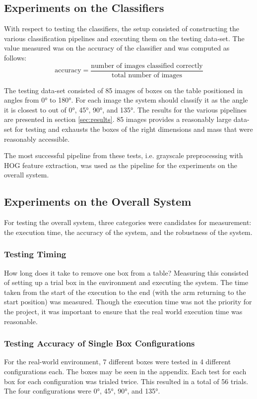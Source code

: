 \documentclass[letterpaper, 10 pt, conference]{conf/ieeeconf}  %
\begin{document}
\subsection{Experiments on the Classifiers}
With respect to testing the classifiers, the setup consisted of constructing the
various classification pipelines and executing them on the testing data-set. The
value measured was on the accuracy of the classifier and was computed as
follows:
\begin{equation*}
  \text{accuracy} = \dfrac{\text{number of images classified correctly}}{\text{total number of images}}
\end{equation*}

The testing data-set consisted of 85 images of boxes on the table positioned in
angles from \ang{0} to \ang{180}. For each image the system should classify it
as the angle it is closest to out of \ang{0}, \ang{45}, \ang{90}, and \ang{135}.
The results for the various pipelines are presented in section
\ref{sec:results}. 85 images provides a reasonably large data-set for testing
and exhausts the boxes of the right dimensions and mass that were reasonably
accessible.

The most successful pipeline from these tests, i.e. grayscale preprocessing with
HOG feature extraction, was used as the pipeline for the experiments on the
overall system.

\subsection{Experiments on the Overall System}
For testing the overall system, three categories were candidates for
measurement: the execution time, the accuracy of the system, and the robustness
of the system.
\subsubsection{Testing Timing}
How long does it take to remove one box from a table? Measuring this consisted
of setting up a trial box in the environment and executing the system. The time
taken from the start of the execution to the end (with the arm returning to the
start position) was measured. Though the execution time was not the priority for
the project, it was important to ensure that the real world execution time was
reasonable.

\subsubsection{Testing Accuracy of Single Box Configurations}
For the real-world environment, 7 different boxes were tested in 4 different
configurations each. The boxes may be seen in the appendix. Each test for each
box for each configuration was trialed twice. This resulted in a total of 56
trials. The four configurations were \ang{0}, \ang{45}, \ang{90}, and \ang{135}.
\end{document}
